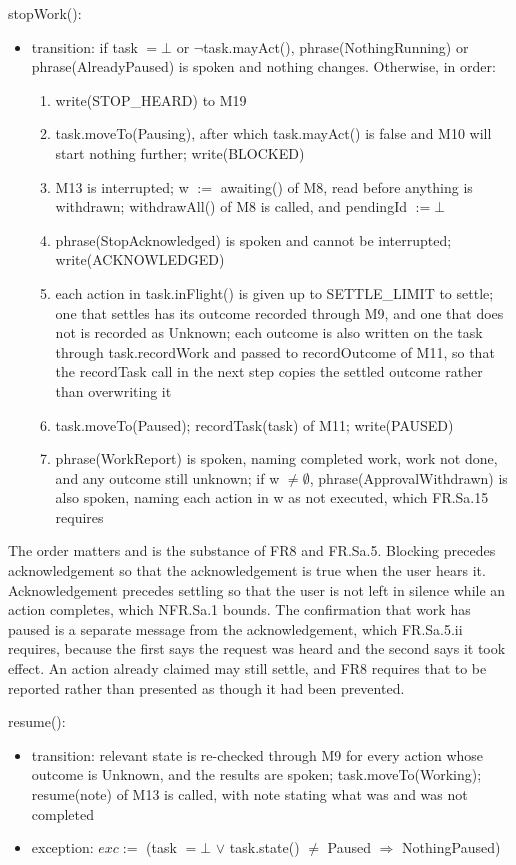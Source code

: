 \documentclass[12pt, titlepage]{article}
\newcommand{\nil}{\bot}
\begin{document}
\noindent stopWork():
\begin{itemize}
\item transition: if task $= \nil$ or $\lnot$task.mayAct(), phrase(NothingRunning)
or phrase(AlreadyPaused) is spoken and nothing changes. Otherwise, in order:
\sloppy
\begin{enumerate}
\item write(STOP\_HEARD) to M19
\item task.moveTo(Pausing), after which task.mayAct() is false and M10 will
start nothing further; write(BLOCKED)
\item M13 is interrupted; w $:=$ awaiting() of M8, read before anything is
withdrawn; withdrawAll() of M8 is called, and pendingId $:= \nil$
\item phrase(StopAcknowledged) is spoken and cannot be interrupted;
write(ACKNOWLEDGED)
\item each action in task.inFlight() is given up to SETTLE\_LIMIT to settle;
one that settles has its outcome recorded through M9, and one that does not is
recorded as Unknown; each outcome is also written on the task through
task.recordWork and passed to recordOutcome of M11, so that the recordTask call
in the next step copies the settled outcome rather than overwriting it
\item task.moveTo(Paused); recordTask(task) of M11; write(PAUSED)
\item phrase(WorkReport) is spoken, naming completed work, work not done, and
any outcome still unknown; if w $\neq \emptyset$, phrase(ApprovalWithdrawn) is
also spoken, naming each action in w as not executed, which FR.Sa.15 requires
\end{enumerate}
\end{itemize}

\noindent The order matters and is the substance of FR8 and FR.Sa.5. Blocking
precedes acknowledgement so that the acknowledgement is true when the user hears
it. Acknowledgement precedes settling so that the user is not left in silence
while an action completes, which NFR.Sa.1 bounds. The confirmation that work has
paused is a separate message from the acknowledgement, which FR.Sa.5.ii
requires, because the first says the request was heard and the second says it
took effect. An action already claimed may still settle, and FR8 requires that
to be reported rather than presented as though it had been prevented.

\noindent resume():
\begin{itemize}
\item transition: relevant state is re-checked through M9 for every action whose
outcome is Unknown, and the results are spoken; task.moveTo(Working); resume(note) of
M13 is called, with note stating what was and was not completed
\item exception: $exc :=$ (task $= \nil$ $\vee$ task.state() $\neq$ Paused
$\Rightarrow$ NothingPaused)
\end{itemize}
\end{document}
